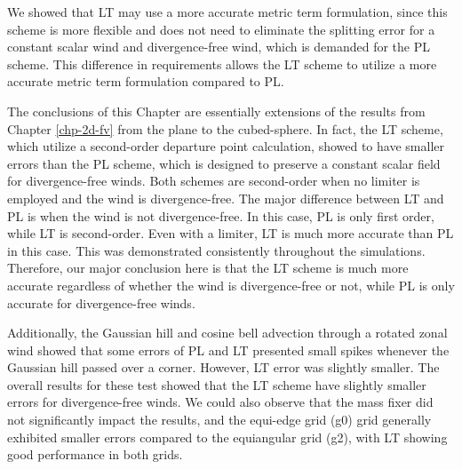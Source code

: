We showed that LT may use a more accurate metric term formulation, since this scheme is more flexible and does not need to eliminate the splitting error for a constant
scalar wind and divergence-free wind, which is demanded for the PL scheme.
This difference in requirements allows the LT scheme to utilize a more accurate metric term formulation compared to PL.


The conclusions of this Chapter are essentially extensions of the results from Chapter \ref{chp-2d-fv} from the plane to the cubed-sphere.
In fact, the LT scheme, which utilize a second-order departure point calculation, showed to have smaller errors than the PL scheme,
which is designed to preserve a constant scalar field for divergence-free winds.
Both schemes are second-order when no limiter is employed and the wind is divergence-free.
The major difference between LT and PL is when the wind is not divergence-free.
In this case, PL is only first order, while LT is second-order. Even with a limiter, LT is much more accurate than PL in this case.
This was demonstrated consistently throughout the simulations.
Therefore, our major conclusion here is that the LT scheme is much more accurate regardless of whether the wind is divergence-free or not, while 
PL is only accurate for divergence-free winds.

Additionally, the Gaussian hill and cosine bell advection through a rotated zonal wind showed 
that some errors of PL and LT presented small spikes whenever the Gaussian hill passed over a corner.
However, LT error was slightly smaller.
The overall results for these test showed that the LT scheme have slightly smaller errors for divergence-free winds.
We could also observe that the mass fixer did not significantly impact the results,
and the equi-edge grid (g0) grid generally exhibited smaller errors compared to the equiangular grid (g2), with LT showing good performance in both grids.
